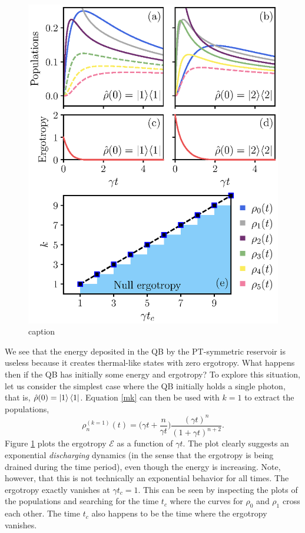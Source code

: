 \documentclass[%
reprint,
superscriptaddress,
amsmath,amssymb,
aps,
pra,
]{revtex4-2}
\begin{document}
\begin{figure}[H]
\includegraphics[width=\linewidth]{fig4.eps}
\caption{caption}
\label{fig4}
\end{figure}

We see that the energy deposited in the QB by the PT-symmetric reservoir is useless because it creates thermal-like states with zero ergotropy. What happens then if the QB has initially some energy and ergotropy? To explore this situation, let us consider the simplest case where the QB initially holds a single photon, that is, $\hat{\rho}(0) = \ket{1}\bra{1}$. Equation \eqref{mk} can then be used with $k = 1$ to extract the populations, 
\begin{equation}
    \rho_n^{(k=1)}(t) = \Bigg( \gamma t + \frac{n}{\gamma t} \Bigg) \frac{(\gamma t)^n}{(1+\gamma t)^{n+2}}.
\end{equation}
Figure \ref{fig4} plots the ergotropy $\mathcal{E}$ as a function of $\gamma t$. The plot clearly suggests an exponential \textit{discharging} dynamics (in the sense that the ergotropy is being drained during the time period), even though the energy is increasing. Note, however, that this is not technically an exponential behavior for all times. The ergotropy exactly vanishes at $\gamma t_c = 1$. This can be seen by inspecting the plots of the populations and searching for the time $t_c$ where the curves for $\rho_0$ and $\rho_1$ cross each other. The time $t_c$ also happens to be the time where the ergotropy vanishes. 
\end{document}
